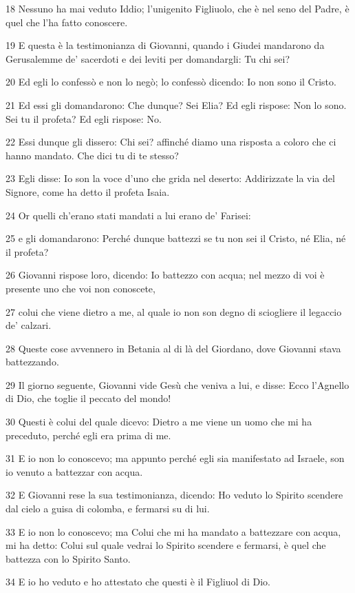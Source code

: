 \par 18 Nessuno ha mai veduto Iddio; l'unigenito Figliuolo, che è nel seno del Padre, è quel che l'ha fatto conoscere.
\par 19 E questa è la testimonianza di Giovanni, quando i Giudei mandarono da Gerusalemme de' sacerdoti e dei leviti per domandargli: Tu chi sei?
\par 20 Ed egli lo confessò e non lo negò; lo confessò dicendo: Io non sono il Cristo.
\par 21 Ed essi gli domandarono: Che dunque? Sei Elia? Ed egli rispose: Non lo sono. Sei tu il profeta? Ed egli rispose: No.
\par 22 Essi dunque gli dissero: Chi sei? affinché diamo una risposta a coloro che ci hanno mandato. Che dici tu di te stesso?
\par 23 Egli disse: Io son la voce d'uno che grida nel deserto: Addirizzate la via del Signore, come ha detto il profeta Isaia.
\par 24 Or quelli ch'erano stati mandati a lui erano de' Farisei:
\par 25 e gli domandarono: Perché dunque battezzi se tu non sei il Cristo, né Elia, né il profeta?
\par 26 Giovanni rispose loro, dicendo: Io battezzo con acqua; nel mezzo di voi è presente uno che voi non conoscete,
\par 27 colui che viene dietro a me, al quale io non son degno di sciogliere il legaccio de' calzari.
\par 28 Queste cose avvennero in Betania al di là del Giordano, dove Giovanni stava battezzando.
\par 29 Il giorno seguente, Giovanni vide Gesù che veniva a lui, e disse: Ecco l'Agnello di Dio, che toglie il peccato del mondo!
\par 30 Questi è colui del quale dicevo: Dietro a me viene un uomo che mi ha preceduto, perché egli era prima di me.
\par 31 E io non lo conoscevo; ma appunto perché egli sia manifestato ad Israele, son io venuto a battezzar con acqua.
\par 32 E Giovanni rese la sua testimonianza, dicendo: Ho veduto lo Spirito scendere dal cielo a guisa di colomba, e fermarsi su di lui.
\par 33 E io non lo conoscevo; ma Colui che mi ha mandato a battezzare con acqua, mi ha detto: Colui sul quale vedrai lo Spirito scendere e fermarsi, è quel che battezza con lo Spirito Santo.
\par 34 E io ho veduto e ho attestato che questi è il Figliuol di Dio.
